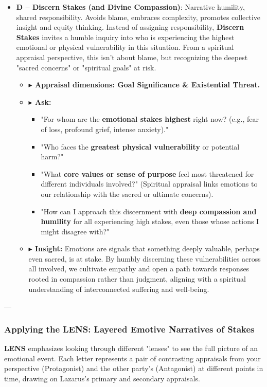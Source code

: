\documentclass{article}
\begin{document}
\begin{itemize}[noitemsep,topsep=0pt]
    \item \textbf{D – Discern Stakes (and Divine Compassion)}: Narrative humility, shared responsibility. Avoids blame, embraces complexity, promotes collective insight and equity thinking. Instead of assigning responsibility, \textbf{Discern Stakes} invites a humble inquiry into who is experiencing the highest emotional or physical vulnerability in this situation. From a spiritual appraisal perspective, this isn't about blame, but recognizing the deepest "sacred concerns" or "spiritual goals" at risk.
    \begin{itemize}[noitemsep,topsep=0pt]
        \item \textbf{$\blacktriangleright$ Appraisal dimensions: Goal Significance \& Existential Threat.}
        \item \textbf{$\blacktriangleright$ Ask:}
        \begin{itemize}[noitemsep,topsep=0pt]
            \item "For whom are the \textbf{emotional stakes highest} right now? (e.g., fear of loss, profound grief, intense anxiety)."
            \item "Who faces the \textbf{greatest physical vulnerability} or potential harm?"
            \item "What \textbf{core values or sense of purpose} feel most threatened for different individuals involved?" (Spiritual appraisal links emotions to our relationship with the sacred or ultimate concerns).
            \item "How can I approach this discernment with \textbf{deep compassion and humility} for all experiencing high stakes, even those whose actions I might disagree with?"
        \end{itemize}
        \item \textbf{$\blacktriangleright$ Insight:} Emotions are signals that something deeply valuable, perhaps even sacred, is at stake. By humbly discerning these vulnerabilities across all involved, we cultivate empathy and open a path towards responses rooted in compassion rather than judgment, aligning with a spiritual understanding of interconnected suffering and well-being.
    \end{itemize}
\end{itemize}

---

\subsubsection*{\textbf{Applying the LENS: Layered Emotive Narratives of Stakes}}
\textbf{LENS} emphasizes looking through different "lenses" to see the full picture of an emotional event. Each letter represents a pair of contrasting appraisals from your perspective (Protagonist) and the other party's (Antagonist) at different points in time, drawing on Lazarus's primary and secondary appraisals.
\end{document}
